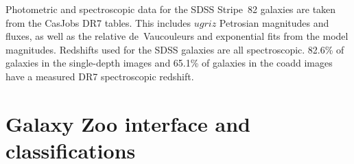 \documentclass[twocolumn]{aastex6}
\begin{document}

Photometric and spectroscopic data for the SDSS Stripe~82 galaxies are taken from the CasJobs DR7 tables. This includes $ugriz$ Petrosian magnitudes and fluxes, as well as the relative de~Vaucouleurs and exponential fits from the model magnitudes. Redshifts used for the SDSS galaxies are all spectroscopic. 82.6\% of galaxies in the single-depth images and 65.1\% of galaxies in the coadd images have a measured DR7 spectroscopic redshift. 

\section{Galaxy Zoo interface and classifications}\label{sec:interface}
\end{document}
